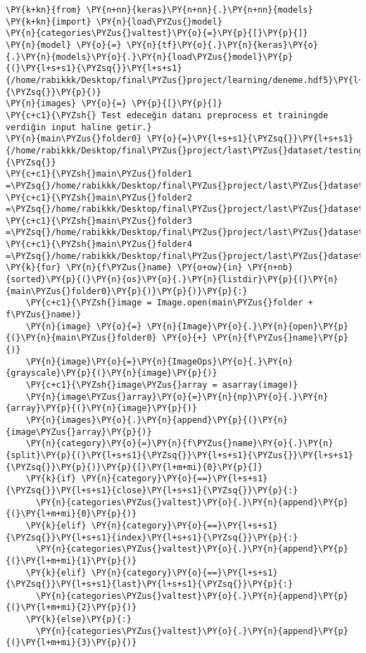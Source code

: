     \begin{tcolorbox}[breakable, size=fbox, boxrule=1pt, pad at break*=1mm,colback=cellbackground, colframe=cellborder]
\begin{Verbatim}[commandchars=\\\{\}]
\PY{k+kn}{from} \PY{n+nn}{keras}\PY{n+nn}{.}\PY{n+nn}{models} \PY{k+kn}{import} \PY{n}{load\PYZus{}model}  
\PY{n}{categories\PYZus{}valtest}\PY{o}{=}\PY{p}{[}\PY{p}{]}
\PY{n}{model} \PY{o}{=} \PY{n}{tf}\PY{o}{.}\PY{n}{keras}\PY{o}{.}\PY{n}{models}\PY{o}{.}\PY{n}{load\PYZus{}model}\PY{p}{(}\PY{l+s+s1}{\PYZsq{}}\PY{l+s+s1}{/home/rabikkk/Desktop/final\PYZus{}project/learning/deneme.hdf5}\PY{l+s+s1}{\PYZsq{}}\PY{p}{)}
\PY{n}{images} \PY{o}{=} \PY{p}{[}\PY{p}{]}
\PY{c+c1}{\PYZsh{} Test edeceğin datanı preprocess et trainingde verdiğin input haline getir.}
\PY{n}{main\PYZus{}folder0} \PY{o}{=}\PY{l+s+s1}{\PYZsq{}}\PY{l+s+s1}{/home/rabikkk/Desktop/final\PYZus{}project/last\PYZus{}dataset/testing/Set1/}\PY{l+s+s1}{\PYZsq{}}
\PY{c+c1}{\PYZsh{}main\PYZus{}folder1 =\PYZsq{}/home/rabikkk/Desktop/final\PYZus{}project/last\PYZus{}dataset/testing/Set2/\PYZsq{}}
\PY{c+c1}{\PYZsh{}main\PYZus{}folder2 =\PYZsq{}/home/rabikkk/Desktop/final\PYZus{}project/last\PYZus{}dataset/testing/Set3/\PYZsq{}}
\PY{c+c1}{\PYZsh{}main\PYZus{}folder3 =\PYZsq{}/home/rabikkk/Desktop/final\PYZus{}project/last\PYZus{}dataset/testing/Set4/\PYZsq{}}
\PY{c+c1}{\PYZsh{}main\PYZus{}folder4 =\PYZsq{}/home/rabikkk/Desktop/final\PYZus{}project/last\PYZus{}dataset/testing/Set5/\PYZsq{}}
\PY{k}{for} \PY{n}{f\PYZus{}name} \PY{o+ow}{in} \PY{n+nb}{sorted}\PY{p}{(}\PY{n}{os}\PY{o}{.}\PY{n}{listdir}\PY{p}{(}\PY{n}{main\PYZus{}folder0}\PY{p}{)}\PY{p}{)}\PY{p}{:}
    \PY{c+c1}{\PYZsh{}image = Image.open(main\PYZus{}folder + f\PYZus{}name)}
    \PY{n}{image} \PY{o}{=} \PY{n}{Image}\PY{o}{.}\PY{n}{open}\PY{p}{(}\PY{n}{main\PYZus{}folder0} \PY{o}{+} \PY{n}{f\PYZus{}name}\PY{p}{)}
    \PY{n}{image}\PY{o}{=}\PY{n}{ImageOps}\PY{o}{.}\PY{n}{grayscale}\PY{p}{(}\PY{n}{image}\PY{p}{)}
    \PY{c+c1}{\PYZsh{}image\PYZus{}array = asarray(image)}
    \PY{n}{image\PYZus{}array}\PY{o}{=}\PY{n}{np}\PY{o}{.}\PY{n}{array}\PY{p}{(}\PY{n}{image}\PY{p}{)}
    \PY{n}{images}\PY{o}{.}\PY{n}{append}\PY{p}{(}\PY{n}{image\PYZus{}array}\PY{p}{)}
    \PY{n}{category}\PY{o}{=}\PY{n}{f\PYZus{}name}\PY{o}{.}\PY{n}{split}\PY{p}{(}\PY{l+s+s1}{\PYZsq{}}\PY{l+s+s1}{\PYZus{}}\PY{l+s+s1}{\PYZsq{}}\PY{p}{)}\PY{p}{[}\PY{l+m+mi}{0}\PY{p}{]}
    \PY{k}{if} \PY{n}{category}\PY{o}{==}\PY{l+s+s1}{\PYZsq{}}\PY{l+s+s1}{close}\PY{l+s+s1}{\PYZsq{}}\PY{p}{:}
      \PY{n}{categories\PYZus{}valtest}\PY{o}{.}\PY{n}{append}\PY{p}{(}\PY{l+m+mi}{0}\PY{p}{)}
    \PY{k}{elif} \PY{n}{category}\PY{o}{==}\PY{l+s+s1}{\PYZsq{}}\PY{l+s+s1}{index}\PY{l+s+s1}{\PYZsq{}}\PY{p}{:} 
      \PY{n}{categories\PYZus{}valtest}\PY{o}{.}\PY{n}{append}\PY{p}{(}\PY{l+m+mi}{1}\PY{p}{)}
    \PY{k}{elif} \PY{n}{category}\PY{o}{==}\PY{l+s+s1}{\PYZsq{}}\PY{l+s+s1}{last}\PY{l+s+s1}{\PYZsq{}}\PY{p}{:} 
      \PY{n}{categories\PYZus{}valtest}\PY{o}{.}\PY{n}{append}\PY{p}{(}\PY{l+m+mi}{2}\PY{p}{)}
    \PY{k}{else}\PY{p}{:}
      \PY{n}{categories\PYZus{}valtest}\PY{o}{.}\PY{n}{append}\PY{p}{(}\PY{l+m+mi}{3}\PY{p}{)}


\end{Verbatim}
\end{tcolorbox}
